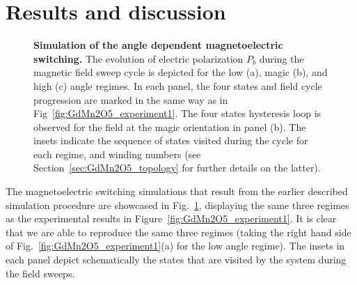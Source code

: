 \section{Results and discussion}
\begin{figure}
    \caption{\label{fig:GdMn2O5_theory}{\bf Simulation of the angle dependent magnetoelectric switching.}
    The evolution of electric polarization $P_b$ during the magnetic field sweep cycle is depicted for the low (a), magic (b), and high (c) angle regimes. 
   In each panel, the four states and field cycle progression are marked in the same way as in Fig~\ref{fig:GdMn2O5_experiment1}. The four states hysteresis loop is observed for the field at the magic orientation in panel (b). 
    The insets indicate the sequence of states visited during the cycle for each regime, and winding numbers (see Section~\ref{sec:GdMn2O5_topology} for further details on the latter).
}
\end{figure}
The magnetoelectric switching simulations that result from the earlier described simulation procedure are showcased in Fig.~\ref{fig:GdMn2O5_theory}, displaying the same three regimes as the experimental results in Figure~\ref{fig:GdMn2O5_experiment1}.
It is clear that we are able to reproduce the same three regimes (taking the right hand side of Fig.~\ref{fig:GdMn2O5_experiment1}(a) for the low angle regime).
The insets in each panel depict schematically the states that are visited by the system during the field sweeps.

